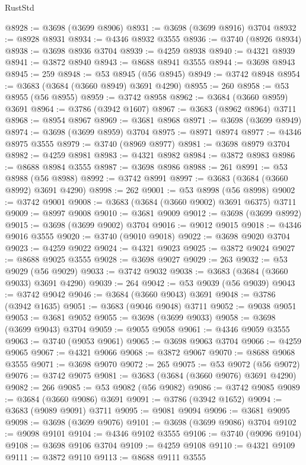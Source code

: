 \begin{lexlean}{RustStd}
\begin{coremodule}
{\begin{coremodule}
{{{{{{{{{{{{{{{{{{{{{{{{{{{{{{{{{{{{{{{{{{{{{{{@8928 := @3698 (@3699 @8906)
@8931 := @3698 (@3699 @8916) @3704
@8932 := @8928 @8931
@8934 := @4346 @8932 @3555
@8936 := @3740 (@8926 @8934)
@8938 := @3698 @8936 @3704
@8939 := @4259 @8938
@8940 := @4321 @8939
@8941 := @3872 @8940
@8943 := @8688 @8941 @3555
@8944 := @3698 @8943
@8945 := 259
@8948 := @53 @8945 (@56 @8945)
@8949 := @3742 @8948
@8954 := @3683 (@3684 (@3660 @8949) @3691 @4290)
@8955 := 260
@8958 := @53 @8955 (@56 @8955)
@8959 := @3742 @8958
@8962 := @3684 (@3660 @8959) @3691
@8964 := @3786 (@3942 @1607)
@8967 := @3683 (@8962 @8964) @3711
@8968 := @8954 @8967
@8969 := @3681 @8968
@8971 := @3698 (@3699 @8949)
@8974 := @3698 (@3699 @8959) @3704
@8975 := @8971 @8974
@8977 := @4346 @8975 @3555
@8979 := @3740 (@8969 @8977)
@8981 := @3698 @8979 @3704
@8982 := @4259 @8981
@8983 := @4321 @8982
@8984 := @3872 @8983
@8986 := @8688 @8984 @3555
@8987 := @3698 @8986
@8988 := 261
@8991 := @53 @8988 (@56 @8988)
@8992 := @3742 @8991
@8997 := @3683 (@3684 (@3660 @8992) @3691 @4290)
@8998 := 262
@9001 := @53 @8998 (@56 @8998)
@9002 := @3742 @9001
@9008 := @3683 (@3684 (@3660 @9002) @3691 @6375) @3711
@9009 := @8997 @9008
@9010 := @3681 @9009
@9012 := @3698 (@3699 @8992)
@9015 := @3698 (@3699 @9002) @3704
@9016 := @9012 @9015
@9018 := @4346 @9016 @3555
@9020 := @3740 (@9010 @9018)
@9022 := @3698 @9020 @3704
@9023 := @4259 @9022
@9024 := @4321 @9023
@9025 := @3872 @9024
@9027 := @8688 @9025 @3555
@9028 := @3698 @9027
@9029 := 263
@9032 := @53 @9029 (@56 @9029)
@9033 := @3742 @9032
@9038 := @3683 (@3684 (@3660 @9033) @3691 @4290)
@9039 := 264
@9042 := @53 @9039 (@56 @9039)
@9043 := @3742 @9042
@9046 := @3684 (@3660 @9043) @3691
@9048 := @3786 (@3942 @1635)
@9051 := @3683 (@9046 @9048) @3711
@9052 := @9038 @9051
@9053 := @3681 @9052
@9055 := @3698 (@3699 @9033)
@9058 := @3698 (@3699 @9043) @3704
@9059 := @9055 @9058
@9061 := @4346 @9059 @3555
@9063 := @3740 (@9053 @9061)
@9065 := @3698 @9063 @3704
@9066 := @4259 @9065
@9067 := @4321 @9066
@9068 := @3872 @9067
@9070 := @8688 @9068 @3555
@9071 := @3698 @9070
@9072 := 265
@9075 := @53 @9072 (@56 @9072)
@9076 := @3742 @9075
@9081 := @3683 (@3684 (@3660 @9076) @3691 @4290)
@9082 := 266
@9085 := @53 @9082 (@56 @9082)
@9086 := @3742 @9085
@9089 := @3684 (@3660 @9086) @3691
@9091 := @3786 (@3942 @1652)
@9094 := @3683 (@9089 @9091) @3711
@9095 := @9081 @9094
@9096 := @3681 @9095
@9098 := @3698 (@3699 @9076)
@9101 := @3698 (@3699 @9086) @3704
@9102 := @9098 @9101
@9104 := @4346 @9102 @3555
@9106 := @3740 (@9096 @9104)
@9108 := @3698 @9106 @3704
@9109 := @4259 @9108
@9110 := @4321 @9109
@9111 := @3872 @9110
@9113 := @8688 @9111 @3555
}}}}}}}}}}}}}}}}}}}}}}}}}}}}}}}}}}}}}}}}}}}}}}}
\end{coremodule}}
\end{coremodule}
\end{lexlean}
